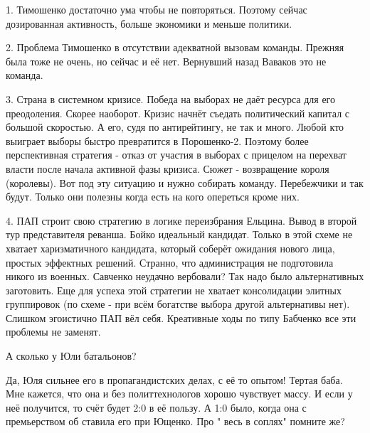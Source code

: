 \begin{itemize}

1. Тимошенко достаточно ума чтобы не повторяться. Поэтому сейчас дозированная
активность, больше экономики и меньше политики. 

2. Проблема Тимошенко в отсутствии адекватной вызовам команды. Прежняя была
тоже не очень, но сейчас и её нет. Вернувший назад Ваваков это не команда. 

3. Страна в системном кризисе.  Победа на выборах не даёт ресурса для его
преодоления. Скорее наоборот. Кризис начнёт съедать политический капитал с
большой скоростью. А его, судя по антирейтингу, не так и много. Любой кто
выиграет выборы быстро превратится в Порошенко-2. Поэтому более перспективная
стратегия - отказ от участия в выборах с прицелом на перехват власти после
начала активной фазы кризиса. Сюжет - возвращение короля (королевы). Вот под
эту ситуацию и нужно собирать команду.  Перебежчики и так будут. Только они
полезны когда есть на кого опереться кроме них. 

4. ПАП строит свою стратегию в логике переизбрания Ельцина. Вывод в второй тур
представителя реванша. Бойко идеальный кандидат. Только в этой схеме не хватает
харизматичного кандидата, который соберёт ожидания нового лица, простых
эффектных решений. Странно, что администрация не подготовила никого из военных.
Савченко неудачно вербовали? Так надо было альтернативных заготовить. Еще для
успеха этой стратегии не хватает консолидации элитных группировок (по схеме -
при всём богатстве выбора другой альтернативы нет). Слишком эгоистично ПАП вёл
себя. Креативные ходы по типу Бабченко все эти проблемы не заменят.

А сколько у Юли батальонов?


Да, Юля сильнее его в пропагандистских делах, с её то опытом! Тертая баба. Мне
кажется, что она и без политтехнологов хорошо чувствует массу. И если у неё
получится, то счёт будет 2:0 в её пользу. А 1:0 было, когда она с премьерством об
ставила его при Ющенко. Про " весь в соплях" помните же?

\end{itemize} %

